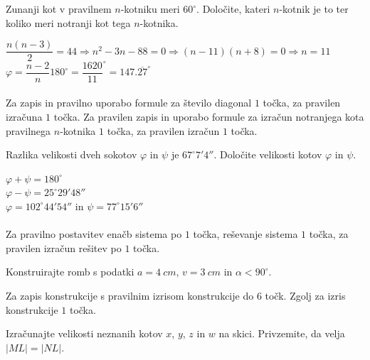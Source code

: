 \documentclass[addpoints]{exam}
\begin{document}
\begin{questions}


    \question[3]
    Zunanji kot v pravilnem $n$-kotniku meri $60^\circ$. Določite, kateri $n$-kotnik je to ter koliko meri notranji kot tega $n$-kotnika.

    \begin{solution}[6cm]
        $ \dfrac{n(n-3)}{2}=44 \Rightarrow n^2-3n-88=0 \Rightarrow (n-11)(n+8)=0 \Rightarrow n=11 $ \\
        $ \varphi=\dfrac{n-2}{n}180^\circ=\dfrac{1620}{11}^\circ=147.\overline{27}^\circ $ \\ \\
        Za zapis in pravilno uporabo formule za število diagonal $1$ točka, za pravilen izračuna $1$ točka. 
        Za pravilen zapis in uporabo formule za izračun notranjega kota pravilnega $n$-kotnika $1$ točka, za pravilen izračun $1$ točka.
    \end{solution}



    \question[5]
    Razlika velikosti dveh sokotov $\varphi$ in $\psi$ je $67^\circ 7' 4''$.
    Določite velikosti kotov $\varphi$ in $\psi$.

    \begin{solution}[5cm]
        $\varphi+\psi=180^\circ$ \\
        $\varphi-\psi=25^\circ 29' 48''$ \\
        $\varphi=102^\circ 44' 54''$ in $\psi=77^\circ 15' 6 ''$ \\ \\
        Za pravilno postavitev enačb sistema po $1$ točka, reševanje sistema $1$ točka, za pravilen izračun rešitev po $1$ točka.
    \end{solution}

    

    \newpage

    \question[6]
    Konstruirajte romb s podatki $a=4~cm$, $v=3~cm$ in $\alpha<90^\circ$.

    \begin{solution}[15cm]
        Za zapis konstrukcije s pravilnim izrisom konstrukcije do $6$ točk. Zgolj za izris konstrukcije $1$ točka.
    \end{solution}




    \newpage

    \question[4]
    Izračunajte velikosti neznanih kotov $x$, $y$, $z$ in $w$ na skici. Privzemite, da velja $|ML|=|NL|$.


\end{questions}
\end{document}

